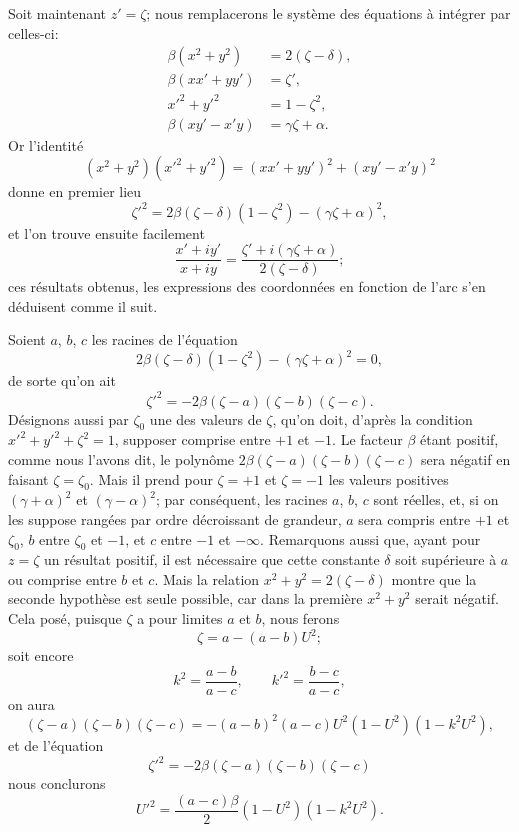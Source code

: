 \documentclass[11pt,leqno,oneside,letterpaper]{book}[2005/09/16]
\begin{document}
Soit maintenant $z' = \zeta$; nous remplacerons le syst\`eme des \'equations \`a
int\'egrer par celles-ci:
\begin{align*}
\beta(x^2 + y^2) &= 2(\zeta - \delta), \\
\beta(xx' + yy') &= \zeta', \\
     x'^2 + y'^2 &= 1 - \zeta^2, \\
\beta(xy' - x'y) &= \gamma\zeta + \alpha.
\end{align*}
Or l'identit\'e
\[
(x^2 + y^2)(x'^2 + y'^2) = (xx' + yy')^2 + (xy' - x'y)^2
\]
donne en premier lieu
\[
\zeta'^2 = 2\beta(\zeta - \delta)(1 - \zeta^2) - (\gamma\zeta + \alpha)^2,
\]
et l'on trouve ensuite facilement
\[
\frac{x' + iy'}{x + iy} = \frac{\zeta' + i(\gamma\zeta + \alpha)}
                               {2(\zeta - \delta)};
\]
ces r\'esultats obtenus, les expressions des coordonn\'ees en fonction de l'arc
s'en d\'eduisent comme il suit.

Soient $a$, $b$, $c$ les racines de l'\'equation
\[
2 \beta (\zeta - \delta)(1 - \zeta^2) - (\gamma\zeta + \alpha)^2 = 0,
\]
de sorte qu'on ait
\[
\zeta'^2 = -2\beta(\zeta - a)(\zeta - b)(\zeta - c).
\]
D\'esignons aussi par $\zeta_0$ une des valeurs de $\zeta$, qu'on doit, d'apr\`es la condition
$x'^2 + y'^2 + \zeta^2 = 1$, supposer comprise entre $+1$ et $-1$. Le facteur $\beta$
\'etant positif, comme nous l'avons dit, le polyn\^ome $2\beta(\zeta-a)(\zeta-b)(\zeta-c)$
sera n\'egatif en faisant $\zeta = \zeta_0$. Mais il prend pour $\zeta=+1$ et $\zeta=-1$ les
valeurs positives $(\gamma + \alpha)^2$ et $(\gamma-\alpha)^2$; par cons\'equent, les racines $a$, $b$, $c$
sont r\'eelles, et, si on les suppose rang\'ees par ordre d\'ecroissant de grandeur,
$a$ sera compris entre $+1$ et $\zeta_0$, $b$ entre $\zeta_0$ et $-1$, et $c$ entre $-1$ et $-\infty$.
Remarquons aussi que, ayant pour $z = \zeta$ un r\'esultat positif, il est n\'ecessaire
que cette constante $\delta$ soit sup\'erieure \`a $a$ ou comprise entre $b$ et $c$. Mais la
relation $x^2 + y^2 = 2(\zeta-\delta)$ montre que la seconde hypoth\`ese est seule
possible, car dans la premi\`ere $x^2+y^2$ serait n\'egatif. Cela pos\'e, puisque $\zeta$
a pour limites $a$ et $b$, nous ferons
\[
\zeta = a - (a - b) U^2;
\]
soit encore
\[
k^2 = \frac{a-b}{a-c}, \qquad k'^2 = \frac{b-c}{a-c},
\]
on aura
\[
(\zeta - a)(\zeta - b)(\zeta - c) = -(a - b)^2(a - c)U^2(1 - U^2)(1 - k^2U^2),
\]
et de l'\'equation
\[
\zeta'^2 = -2\beta(\zeta - a)(\zeta - b)(\zeta - c)
\]
nous conclurons
\[
U'^2 = \frac{(a - c)\beta}{2}(1 - U^2)(1 - k^2U^2).
\]
\end{document}
